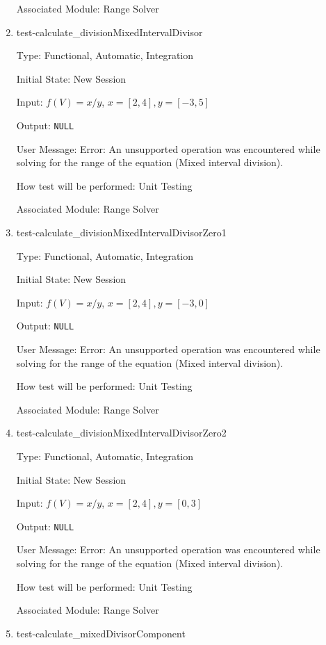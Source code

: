 \documentclass[12pt, titlepage]{article}
\begin{document}
\begin{enumerate}
	Associated Module: Range Solver\\
	
	\item{test-calculate\_divisionMixedIntervalDivisor}
	
	Type: Functional, Automatic, Integration
	
	Initial State: New Session
	
	Input: $f(V) = x / y$, $x = [2,4], y = [-3,5]$
	
	Output: \texttt{NULL}
	
	User Message: Error: An unsupported operation was encountered while solving 
	for the range of the equation (Mixed interval division).
	
	How test will be performed: Unit Testing
	
	Associated Module: Range Solver\\
	
	\item{test-calculate\_divisionMixedIntervalDivisorZero1}
	
	Type: Functional, Automatic, Integration
	
	Initial State: New Session
	
	Input: $f(V) = x / y$, $x = [2,4], y = [-3,0]$
	
	Output: \texttt{NULL}
	
	User Message: Error: An unsupported operation was encountered while solving 
	for the range of the equation (Mixed interval division).
	
	How test will be performed: Unit Testing
	
	Associated Module: Range Solver\\
	
	\item{test-calculate\_divisionMixedIntervalDivisorZero2}
	
	Type: Functional, Automatic, Integration
	
	Initial State: New Session
	
	Input: $f(V) = x / y$, $x = [2,4], y = [0,3]$
	
	Output: \texttt{NULL}
	
	User Message: Error: An unsupported operation was encountered while solving 
	for the range of the equation (Mixed interval division).
	
	How test will be performed: Unit Testing
	
	Associated Module: Range Solver\\
	
	\item{test-calculate\_mixedDivisorComponent}
	

\end{enumerate}
\end{document}
